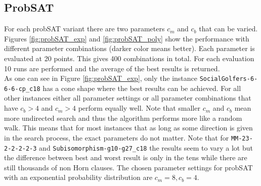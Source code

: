 \documentclass[12pt,a4paper]{article}
\begin{document}
\subsection{ProbSAT}
For each probSAT variant there are two parameters $c_m$ and $c_b$ that can be varied. Figures \ref{fig:probSAT_exp} and \ref{fig:probSAT_poly} show the performance with different parameter combinations (darker color means better). Each parameter is evaluated at 20 points. This gives 400 combinations in total. For each evaluation 10 runs are performed and the average of the best results is returned. \\

As one can see in Figure \ref{fig:probSAT_exp}, only the instance \texttt{SocialGolfers-6-6-6-cp\_c18} has a cone shape where the best results can be achieved. For all other instances either all parameter settings or all parameter combinations that have $c_b > 4$ and $c_m > 4$ perform equally well. Note that smaller $c_m$ and $c_b$ mean more undirected search and thus the algorithm performs more like a random walk. This means that for most instances that as long as some direction is given in the search process, the exact parameters do not matter. Note that for \texttt{MM-23-2-2-2-2-3} and \texttt{Subisomorphism-g10-g27\_c18} the results seem to vary a lot but the difference between best and worst result is only in the tens while there are still thousands of non Horn clauses. The chosen parameter settings for probSAT with an exponential probability distribution are $c_m = 8, c_b=4$.\\
\end{document}
